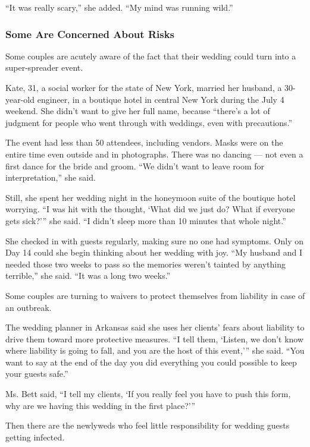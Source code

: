 ``It was really scary,'' she added. ``My mind was running wild.''

\hypertarget{some-are-concerned-about-risks}{%
\subsubsection{Some Are Concerned About
Risks}\label{some-are-concerned-about-risks}}

Some couples are acutely aware of the fact that their wedding could turn
into a super-spreader event.

Kate, 31, a social worker for the state of New York, married her
husband, a 30-year-old engineer, in a boutique hotel in central New York
during the July 4 weekend. She didn't want to give her full name,
because ``there's a lot of judgment for people who went through with
weddings, even with precautions.''

The event had less than 50 attendees, including vendors. Masks were on
the entire time even outside and in photographs. There was no dancing
--- not even a first dance for the bride and groom. ``We didn't want to
leave room for interpretation,'' she said.

Still, she spent her wedding night in the honeymoon suite of the
boutique hotel worrying. ``I was hit with the thought, `What did we just
do? What if everyone gets sick?''' she said. ``I didn't sleep more than
10 minutes that whole night.''

She checked in with guests regularly, making sure no one had symptoms.
Only on Day 14 could she begin thinking about her wedding with joy. ``My
husband and I needed those two weeks to pass so the memories weren't
tainted by anything terrible,'' she said. ``It was a long two weeks.''

Some couples are turning to waivers to protect themselves from liability
in case of an outbreak.

The wedding planner in Arkansas said she uses her clients' fears about
liability to drive them toward more protective measures. ``I tell them,
`Listen, we don't know where liability is going to fall, and you are the
host of this event,''' she said. ``You want to say at the end of the day
you did everything you could possible to keep your guests safe.''

Ms. Bett said, ``I tell my clients, `If you really feel you have to push
this form, why are we having this wedding in the first place?'''

Then there are the newlyweds who feel little responsibility for wedding
guests getting infected.

